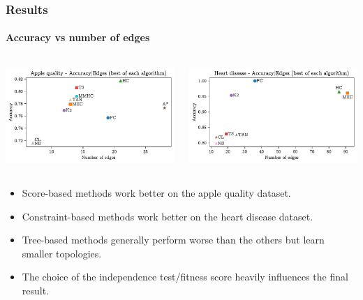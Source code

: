 \documentclass{beamer}
\begin{document}
\begin{frame}
    \frametitle{Results}
    \framesubtitle{Accuracy vs number of edges}

    \begin{columns}
        \begin{center}
            \includegraphics[width=\linewidth]{../report/img/apple_acc_edges.pdf}
        \end{center}

        \begin{center}
            \includegraphics[width=\linewidth]{../report/img/heart_acc_edges.pdf}
        \end{center}
    \end{columns}

    \begin{itemize}
        \small
        \item Score-based methods work better on the apple quality dataset.
        \item Constraint-based methods work better on the heart disease dataset.
        \item Tree-based methods generally perform worse than the others but learn smaller topologies.
        \item The choice of the independence test/fitness score heavily influences the final result.
    \end{itemize}
\end{frame}
\end{document}
